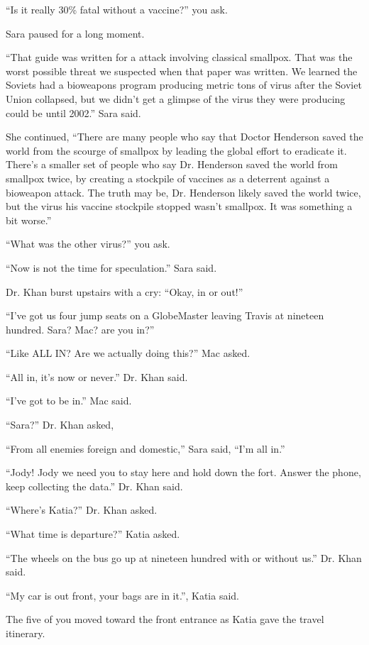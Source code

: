 \documentclass[17pt, twoside, a5paper, openright, extrafontsizes]{memoir}
\begin{document}
``Is it really 30\% fatal without a vaccine?'' you ask.

Sara paused for a long moment.

``That guide was written for a attack involving classical smallpox. That
was the worst possible threat we suspected when that paper was written.
We learned the Soviets had a bioweapons program producing metric tons of
virus after the Soviet Union collapsed, but we didn't get a glimpse of
the virus they were producing could be until 2002.'' Sara said.

She continued, ``There are many people who say that Doctor Henderson
saved the world from the scourge of smallpox by leading the global
effort to eradicate it. There's a smaller set of people who say
Dr. Henderson saved the world from smallpox twice, by creating a
stockpile of vaccines as a deterrent against a bioweapon attack. The
truth may be, Dr. Henderson likely saved the world twice, but the virus
his vaccine stockpile stopped wasn't smallpox. It was something a bit
worse.''

``What was the other virus?'' you ask.

``Now is not the time for speculation.'' Sara said.

Dr. Khan burst upstairs with a cry: ``Okay, in or out!''

``I've got us four jump seats on a GlobeMaster leaving Travis at
nineteen hundred. Sara? Mac? are you in?''

``Like ALL IN? Are we actually doing this?'' Mac asked.

``All in, it's now or never.'' Dr. Khan said.

``I've got to be in.'' Mac said.

``Sara?'' Dr. Khan asked,

``From all enemies foreign and domestic,'' Sara said, ``I'm all in.''

``Jody! Jody we need you to stay here and hold down the fort. Answer the
phone, keep collecting the data.'' Dr. Khan said.

``Where's Katia?'' Dr. Khan asked.

``What time is departure?'' Katia asked.

``The wheels on the bus go up at nineteen hundred with or without us.''
Dr. Khan said.

``My car is out front, your bags are in it.'', Katia said.

The five of you moved toward the front entrance as Katia gave the travel
itinerary.
\end{document}
